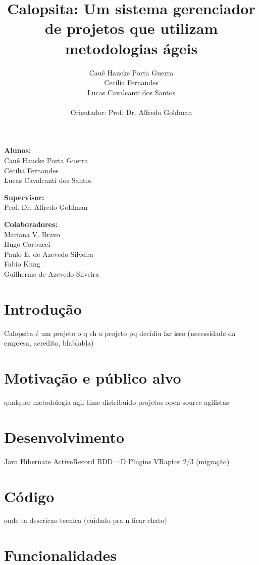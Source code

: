 \documentclass[titlepage,a4paper]{article}
\title{Calopsita: Um sistema gerenciador de projetos que utilizam metodologias ágeis}
\author{Cauê Haucke Porta Guerra\\Cecilia Fernandes\\Lucas Cavalcanti dos Santos\\ \\Orientador: Prof. Dr. Alfredo Goldman}
\begin{document}
\maketitle

\begin{description} 
\item{\textbf{Alunos:}\\Cauê Haucke Porta Guerra\\Cecilia Fernandes\\Lucas Cavalcanti dos Santos}
\item{\textbf{Supervisor:}\\Prof. Dr. Alfredo Goldman}
\item{\textbf{Colaboradores:}\\Mariana V. Bravo\\Hugo Corbucci\\Paulo E. de Azevedo Silveira\\Fabio Kung\\Guilherme de Azevedo Silveira}
\end{description}

\section{Introdução}

Calopsita é um projeto
o q eh o projeto
pq decidiu fzr isso (necessidade da empresa, acredito, blablabla)


\section{Motivação e público alvo}

qualquer metodologia agil
time distribuido
projetos open source
agilistas

\section{Desenvolvimento}
Java
Hibernate
ActiveRecord
BDD =D
Plugins
VRaptor 2/3 (migração)


\section{Código}

onde ta
descricao tecnica (cuidado pra n ficar chato)

\section{Funcionalidades}
\end{document}
